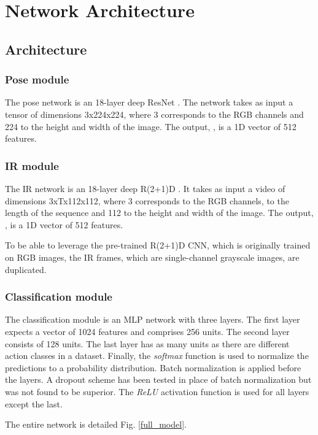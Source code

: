 \documentclass[letterpaper, 10 pt, conference]{ieeeconf}
\begin{document}
\section{Network Architecture}
\subsection{Architecture}

\subsubsection{Pose module}

The pose network is an 18-layer deep ResNet \cite{he2016deep}. The network takes as input a tensor of dimensions 3x224x224, where 3 corresponds to the RGB channels and 224 to the height and width of the image. The output, , is a 1D vector of 512 features.

\subsubsection{IR module}

The IR network is an 18-layer deep R(2+1)D \cite{tran2018closer}. It takes as input a video of dimensions 3xTx112x112, where 3 corresponds to the RGB channels,  to the length of the sequence and 112 to the height and width of the image. The output, , is a 1D vector of 512 features. 

To be able to leverage the pre-trained R(2+1)D CNN, which is originally trained on RGB images, the IR frames, which are single-channel grayscale images, are duplicated.

\subsubsection{Classification module}

The classification module is an MLP network with three layers. The first layer expects a vector of 1024 features and comprises 256 units. The second layer consists of 128 units. The last layer has as many units as there are different action classes in a dataset. Finally, the \textit{softmax} function is used to normalize the predictions to a probability distribution. Batch normalization is applied before the layers. A dropout scheme has been tested in place of batch normalization but was not found to be superior. The \textit{ReLU} activation function is used for all layers except the last.

The entire network is detailed Fig. \ref{full_model}.
\end{document}
